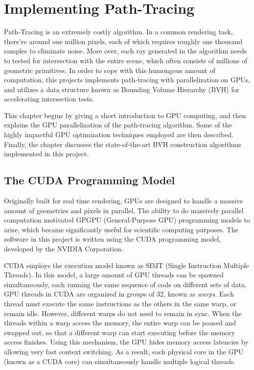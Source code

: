 \chapter{Implementing Path-Tracing}
\label{chapter implementation}

Path-Tracing is an extremely costly algorithm. In a common rendering task, there're around one million pixels, each of which requires roughly one thousand samples to eliminate noise. More over, each ray generated in the algorithm needs to tested for intersection with the entire scene, which often consists of millions of geometric primitives. In order to cope with this humongous amount of computation, this projects implements path-tracing with parallelization on GPUs, and utilizes a data structure known as Bounding Volume Hierarchy (BVH) for accelerating intersection tests. 

This chapter begins by giving a short introduction to GPU computing, and then explains the GPU parallelization of the path-tracing algorithm. Some of the highly impactful GPU optimization techniques employed are then described. Finally, the chapter discusses the state-of-the-art BVH construction algorithms implemented in this project.

\section{The CUDA Programming Model}

Originally built for real time rendering, GPUs are designed to handle a massive amount of geometries and pixels in parallel. The ability to do massively parallel computation motivated GPGPU (General-Purpose GPU) programming models to arise, which became significantly useful for scientific computing purposes. The software in this project is written using the CUDA programming model, developed by the NVIDIA Corporation.

CUDA employs the execution model known as SIMT (Single Instruction Multiple Threads). In this model, a large amount of GPU threads can be spawned simultaneously, each running the same sequence of code on different sets of data. GPU threads in CUDA are organized in groups of 32, known as \textit{warps}. Each thread must execute the same instructions as the others in the same warp, or remain idle. However, different warps do not need to remain in sync. When the threads within a warp access the memory, the entire warp can be paused and swapped out, so that a different warp can start executing before the memory access finishes. Using this mechanism, the GPU hides memory access latencies by allowing very fast context switching. As a result, each physical core in the GPU (known as a CUDA core) can simultaneously handle multiple logical threads.

